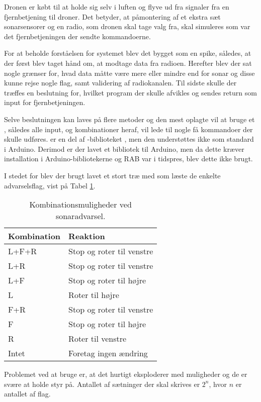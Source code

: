 \documentclass[Main]{subfiles}
\begin{document}
Dronen er købt til at holde sig selv i luften og flyve ud fra signaler fra en fjernbetjening til droner.
Det betyder, at påmontering af et ekstra sæt sonarsensorer og en radio, som dronen skal tage valg fra, skal simuleres som var det fjernbetjeningen der sendte kommandoerne.

For at beholde forståelsen for systemet blev det bygget som en spike, således, at der først blev taget hånd om, at modtage data fra radioen.
Herefter blev der sat nogle grænser for, hvad data måtte være mere eller mindre end for sonar og disse kunne rejse nogle flag, samt validering af radiokanalen.
Til sidste skulle der træffes en beslutning for, hvilket program der skulle afvikles og sendes return som input for fjernbetjeningen.

Selve beslutningen kan laves på flere metoder og den mest oplagte vil at bruge et , således alle input, og kombinationer heraf, vil lede til nogle få kommandoer der skulle udføres.
 er en del af -biblioteket \cite{stl}, men den understøttes ikke som standard i Arduino.
Derimod er der lavet et bibliotek til Arduino\cite{Arduino-stl}, men da dette kræver installation i Arduino-bibliotekerne og RAB var i tidspres, blev dette ikke brugt.

I stedet for  blev der brugt lavet et stort træ med  som læste de enkelte advarselsflag, vist på Tabel \ref{Tab:SonarAdvarsel}.

\begin{table}[H]
\centering
	\begin{tabular}{l l}
	\hline Kombination & Reaktion
	\\ \hline 
	L+F+R & Stop og roter til venstre \\
	L+R & Stop og roter til venstre\\
	L+F & Stop og roter til højre\\
	L & Roter til højre\\
	F+R & Stop og roter til venstre\\
	F & Stop og roter til højre\\
	R & Roter til venstre\\
	Intet & Foretag ingen ændring \\ \hline
	\end{tabular}
\caption{Kombinationsmuligheder ved sonaradvarsel.}
\label{Tab:SonarAdvarsel}
\end{table}

Problemet ved at bruge  er, at det hurtigt eksploderer med muligheder og de er svære at holde styr på.
Antallet af sætninger der skal skrives er $2^n$, hvor $n$ er antallet af flag.
\end{document}
